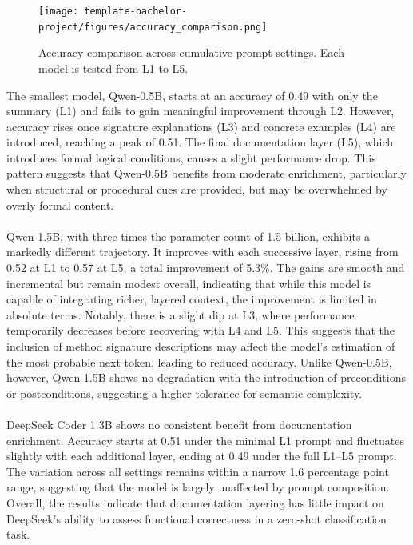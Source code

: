 \documentclass[a4paper]{usiinfbachelorproject}
\begin{document}
\begin{figure}[H]
  \centering
  \texttt{[image: template-bachelor-project/figures/accuracy\_comparison.png]}
  \caption{Accuracy comparison across cumulative prompt settings. Each model is tested from L1 to L5.}
  \label{fig:acc-l1-l5}
\end{figure}
\noindent
The smallest model, Qwen-0.5B, starts at an accuracy of 0.49 with only the summary (L1) and fails to gain meaningful improvement through L2. However, accuracy rises once signature explanations (L3) and concrete examples (L4) are introduced, reaching a peak of 0.51. The final documentation layer (L5), which introduces formal logical conditions, causes a slight performance drop. This pattern suggests that Qwen-0.5B benefits from moderate enrichment, particularly when structural or procedural cues are provided, but may be overwhelmed by overly formal content. \\
\\
Qwen-1.5B, with three times the parameter count of 1.5 billion, exhibits a markedly different trajectory. It improves with each successive layer, rising from 0.52 at L1 to 0.57 at L5, a total improvement of 5.3\%. The gains are smooth and incremental but remain modest overall, indicating that while this model is capable of integrating richer, layered context, the improvement is limited in absolute terms. Notably, there is a slight dip at L3, where performance temporarily decreases before recovering with L4 and L5. This suggests that the inclusion of method signature descriptions may affect the model’s estimation of the most probable next token, leading to reduced accuracy. Unlike Qwen-0.5B, however, Qwen-1.5B shows no degradation with the introduction of preconditions or postconditions, suggesting a higher tolerance for semantic complexity. \\
\\
DeepSeek Coder 1.3B shows no consistent benefit from documentation enrichment. Accuracy starts at 0.51 under the minimal L1 prompt and fluctuates slightly with each additional layer, ending at 0.49 under the full L1–L5 prompt. The variation across all settings remains within a narrow 1.6 percentage point range, suggesting that the model is largely unaffected by prompt composition. Overall, the results indicate that documentation layering has little impact on DeepSeek’s ability to assess functional correctness in a zero-shot classification task.
\end{document}
